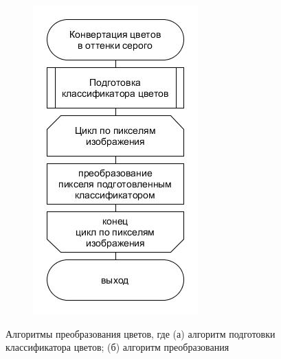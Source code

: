 \documentclass[t]{beamer}
\begin{document}
\begin{frame}
\begin{figure}[ht!]
\begin{subfigure}{.17\textwidth}
				\centering
				\includegraphics[width = \textwidth]{image/chapter_2/colorclassification2}
				\caption{}
			\end{subfigure}
			\centering
			\caption{Алгоритмы преобразования цветов, где (а) алгоритм подготовки классификатора цветов; (б) алгоритм преобразования}
			\label{fig:Examples}
		\end{figure}
		
	\end{frame}
\end{document}
